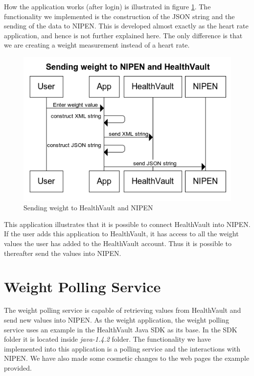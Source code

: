 How the application works (after login) is illustrated in figure \ref{figure:sending-weight-to-healthvault-and-nipen}.
The functionality we implemented is the construction of the JSON string and the sending of the data to NIPEN.
This is developed almost exactly as the heart rate application, and hence is not further explained here.
The only difference is that we are creating a weight measurement instead of a heart rate.

\begin{figure}[h]
\centering
\includegraphics[scale=1.0]{../Figures/sending-weight-to-healthvault-and-nipen.png}
\caption{Sending weight to HealthVault and NIPEN}
\label{figure:sending-weight-to-healthvault-and-nipen}
\end{figure}

This application illustrates that it is possible to connect HealthVault into NIPEN.
If the user adds this application to HealthVault, it has access to all the weight values the user has added to the HealthVault account.
Thus it is possible to thereafter send the values into NIPEN.

\section{Weight Polling Service}

The weight polling service is capable of retrieving values from HealthVault and send new values into NIPEN. 
As the weight application, the weight polling service uses an example in the HealthVault Java SDK \cite{HealthVaultSDK} as its base.
In the SDK folder it is located inside \textit{java-1.4.2} folder.
The functionality we have implemented into this application is a polling service and the interactions with NIPEN.
We have also made some cosmetic changes to the web pages the example provided.

